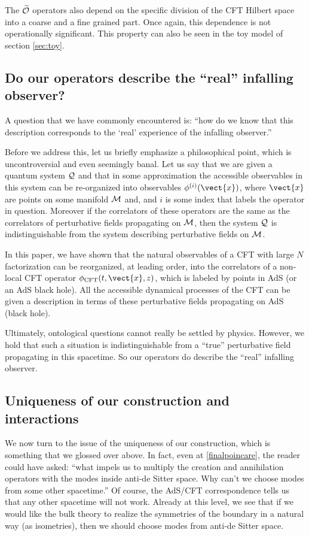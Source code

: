 The $\widetilde{\cal O}$ operators also depend on the specific division of the CFT Hilbert space into a coarse and a fine grained part. Once again, this dependence is not operationally significant. This property can also be seen in the toy model of section \ref{sec:toy}. 
\subsection{Do our operators describe the ``real'' infalling observer?}
A question that we have commonly encountered is: ``how do we know that this description corresponds to the `real' experience of the infalling observer.'' 

Before we address this, let us briefly emphasize a philosophical point, which is uncontroversial and even seemingly banal.  Let us say that we are given a quantum system ${\cal Q}$ and that in some approximation the accessible observables in this system can be re-organized into observables $\phi^{(i)}(\vect{x})$, where ${\vect{x}}$ are points on some manifold ${\cal M}$ and, and $i$ is some index that labels the operator in question.  Moreover if the correlators of these operators are the same as the correlators of perturbative fields propagating on ${\cal M}$, then the system ${\cal Q}$ is indistinguishable from the system describing perturbative fields on ${\cal M}$. 

In this paper, we have shown that the natural observables of a CFT with large $N$ factorization can be reorganized, at leading order, into the correlators of a non-local CFT operator $\phi_{\text{CFT}}(t, \vect{x}, z)$, which is labeled by points in AdS (or an AdS black hole). All the accessible dynamical processes of the CFT can be given a description in terms of these perturbative fields propagating on AdS (black hole).



Ultimately, ontological questions cannot really be settled by physics. However, we hold that such a situation is indistinguishable from a ``true'' perturbative field propagating in this spacetime. So our operators do describe the ``real'' infalling observer. 


\subsection{Uniqueness of our construction and interactions}
We now turn to the issue of the uniqueness of our construction, which is something that we glossed over above. In fact, even at \eqref{finalpoincare}, the reader could have asked: ``what impels us to multiply the creation and annihilation operators with the modes inside anti-de Sitter space. Why can't we choose modes from some other spacetime.''  Of course, the AdS/CFT correspondence tells us that any other spacetime will not work. Already at this level, we see that if we would like the bulk theory to realize the symmetries of the boundary in a natural way (as isometries), then we should choose modes from anti-de Sitter space.

